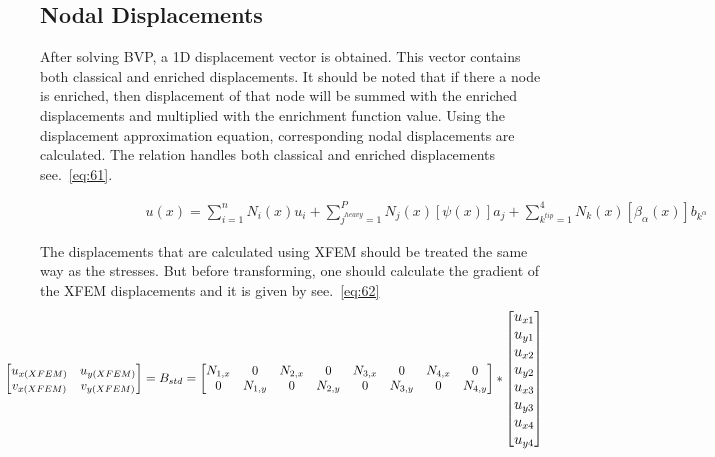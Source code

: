 \documentclass[fleqn, 12.5pt,a4paper]{report}
\begin{document}
\subsection{Nodal Displacements}
After solving BVP, a 1D displacement vector is obtained. This vector contains both classical and enriched displacements. It should be noted that if there a node is enriched, then displacement of that node will be summed with the enriched displacements and multiplied with the enrichment function value. Using the displacement approximation equation, corresponding nodal displacements are calculated. The relation handles both classical and enriched displacements  see.~\autoref{eq:61}.

\begin{align}\label{eq:61}
\hspace{3cm}u(x) = \sum_{i=1}^n N_i(x)u_i + \sum_{j^{heavy}=1}^P N_j(x)[\psi(x)] a_j + \sum_{k^{tip}=1}^4 N_k(x)[\beta_{\alpha}(x)] b_{k^\alpha} 
\end{align}

The displacements that are calculated using XFEM should be treated the same way as the stresses. But before transforming, one should calculate the gradient of the XFEM displacements \cite{ahmed2009extended} and it is given by  see.~\autoref{eq:62}
\vspace{-1.2cm}
\begin{align}\label{eq:62}
\hspace{-1cm}\begin{bmatrix}
u_{x(XFEM)} & u_{y(XFEM)}\\
v_{x(XFEM)} & v_{y(XFEM)}\\
\end{bmatrix}
=
B_{std} = \begin{bmatrix}
N_{1,x} & 0 & N_{2,x} & 0 & N_{3,x} & 0 & N_{4,x} & 0 \\
0 & N_{1,y} & 0 & N_{2,y} & 0 & N_{3,y} & 0 & N_{4,y}\\
\end{bmatrix}
*
\large \begin{bmatrix}
u_{x1}\\
u_{y1}\\
u_{x2}\\
u_{y2}\\
u_{x3}\\
u_{y3}\\
u_{x4}\\
u_{y4}\\
\end{bmatrix} \large
\end{align}
\end{document}
